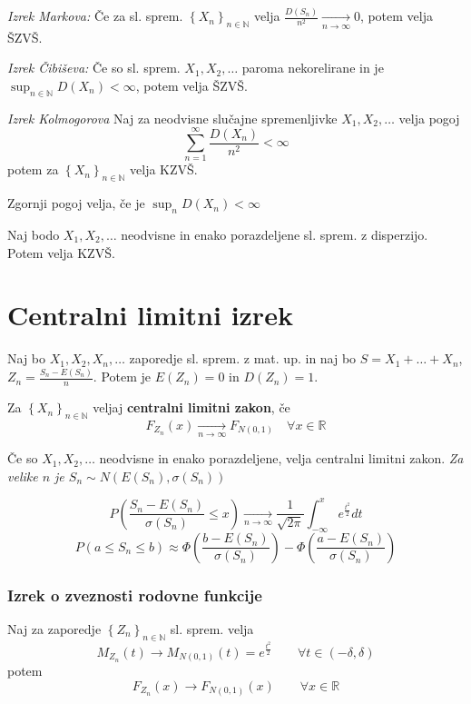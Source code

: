 \begin{multicols}{5}
\textit{Izrek Markova:}
Če za sl. sprem. $\left\{ X_n \right\}_{n \in \mathbb{N}} $ velja $\frac{D(S_n)}{n^2} \xrightarrow[n \to \infty]{} 0$, potem velja ŠZVŠ.

\textit{Izrek Čibiševa:}
Če so sl. sprem. $ X_1, X_2, \dots $ paroma nekorelirane in je $\sup_{n \in \mathbb{N}} D(X_n) < \infty$, potem velja ŠZVŠ.

\textit{Izrek Kolmogorova}
Naj za neodvisne slučajne spremenljivke $X_1, X_2, \dots$ velja pogoj
\[ \sum_{n=1}^\infty \frac{D(X_n)}{n^2} < \infty\]
potem za  $\left\{ X_n \right\}_{n \in \mathbb{N}} $ velja KZVŠ.

Zgornji pogoj velja, če je $\sup_n D(X_n) < \infty$

Naj bodo  $X_1, X_2, \dots$ neodvisne in enako porazdeljene sl. sprem. z disperzijo. Potem velja KZVŠ.

\section{Centralni limitni izrek}
Naj bo $X_1, X_2, X_n, \dots$ zaporedje sl. sprem. z mat. up. in naj bo $S = X_1 +\dots + X_n$, $Z_n = \frac{S_n - E(S_n)}{n}$. Potem je $E(Z_n) = 0$ in $D(Z_n) = 1$.

Za $\left\{ X_n \right\}_{n \in \mathbb{N}} $ veljaj \textbf{centralni limitni zakon}, če
\[ F_{Z_n}(x) \xrightarrow[n \to \infty]{} F_{N(0,1)}  \quad \forall x \in \mathbb{R}\]

Če so $X_1, X_2, \dots$ neodvisne in enako porazdeljene, velja centralni limitni zakon.
\textit{Za velike $n$ je $S_n \sim N(E(S_n), \sigma(S_n))$}

\[ P\left(\frac{S_n - E(S_n)}{\sigma(S_n)} \leq x \right) \xrightarrow[n \to \infty]{} \frac{1}{\sqrt{2\pi}} \int_{-\infty}^{x} e^{\frac{t^2}{2}} dt\]
\[ P(a \leq S_n \leq b) \approx \Phi\left(\frac{b-E(S_n)}{\sigma(S_n)}\right) - \Phi\left(\frac{a-E(S_n)}{\sigma(S_n)}\right)  \]


\subsubsection{Izrek o zveznosti rodovne funkcije}

Naj za zaporedje $\left\{ Z_n \right\}_{n \in \mathbb{N}} $ sl. sprem. velja
\[ M_{Z_n}(t) \to M_{N(0,1)}(t) = e^{\frac{t^2}{2}} \qquad \forall t \in (-\delta, \delta)\]
potem
\[ F_{Z_n}(x) \to F_{N(0,1)}(x)  \qquad \forall x \in \mathbb{R}\]



\end{multicols}
